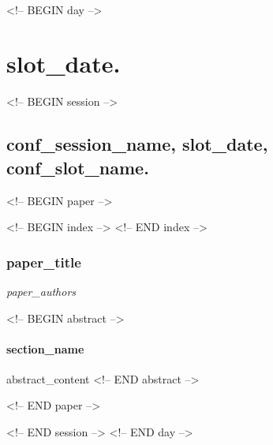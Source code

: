 
\hypertarget{listAbstracts}{~}

<!-- BEGIN day -->
\chapter*{{slot_date}.}

<!-- BEGIN session -->

\section*{{conf_session_name}, {slot_date}, {conf_slot_name}.}

<!-- BEGIN paper -->
 
<!-- BEGIN index -->
<!-- END index -->
\label{{paper_id}}

\subsection*{{paper_title}}
\textit{{paper_authors}}

% 


<!-- BEGIN abstract -->
\subsubsection*{{section_name}}

{abstract_content}
<!-- END abstract -->


<!-- END paper -->

<!-- END session -->
<!-- END day -->
